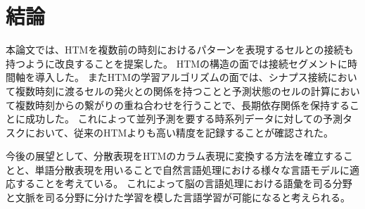 \chapter{結論}
本論文では、HTMを複数前の時刻におけるパターンを表現するセルとの接続も持つように改良することを提案した。
HTMの構造の面では接続セグメントに時間軸を導入した。
またHTMの学習アルゴリズムの面では、シナプス接続において複数時刻に渡るセルの発火との関係を持つことと予測状態のセルの計算において複数時刻からの繋がりの重ね合わせを行うことで、長期依存関係を保持することに成功した。
これによって並列予測を要する時系列データに対しての予測タスクにおいて、従来のHTMよりも高い精度を記録することが確認された。

今後の展望として、分散表現をHTMのカラム表現に変換する方法を確立することと、単語分散表現を用いることで自然言語処理における様々な言語モデルに適応することを考えている。
これによって脳の言語処理における語彙を司る分野と文脈を司る分野に分けた学習を模した言語学習が可能になると考えられる。
